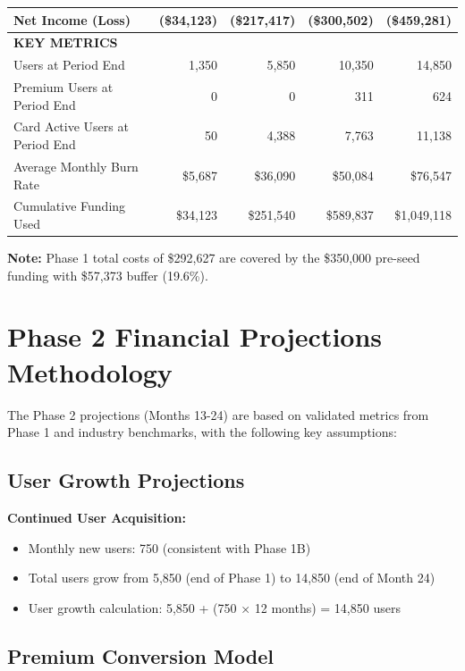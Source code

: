 \documentclass[11pt,letterpaper]{article}
\begin{document}
\begin{center}
\begin{longtable}{|l|r|r|r|r|}
\hline
\textbf{Net Income (Loss)} & \textbf{(\$34,123)} & \textbf{(\$217,417)} & \textbf{(\$300,502)} & \textbf{(\$459,281)} \\
\hline
\hline
\multicolumn{5}{|l|}{\textbf{KEY METRICS}} \\
\hline
Users at Period End & 1,350 & 5,850 & 10,350 & 14,850 \\
Premium Users at Period End & 0 & 0 & 311 & 624 \\
Card Active Users at Period End & 50 & 4,388 & 7,763 & 11,138 \\
Average Monthly Burn Rate & \$5,687 & \$36,090 & \$50,084 & \$76,547 \\
Cumulative Funding Used & \$34,123 & \$251,540 & \$589,837 & \$1,049,118 \\
\hline
\end{longtable}
\end{center}

\textbf{Note:} Phase 1 total costs of \$292,627 are covered by the \$350,000 pre-seed funding with \$57,373 buffer (19.6\%).

\newpage
\section{Phase 2 Financial Projections Methodology}

The Phase 2 projections (Months 13-24) are based on validated metrics from Phase 1 and industry benchmarks, with the following key assumptions:

\subsection{User Growth Projections}

\textbf{Continued User Acquisition:}
\begin{itemize}
\item Monthly new users: 750 (consistent with Phase 1B)
\item Total users grow from 5,850 (end of Phase 1) to 14,850 (end of Month 24)
\item User growth calculation: 5,850 + (750 × 12 months) = 14,850 users
\end{itemize}

\subsection{Premium Conversion Model}
\end{document}
